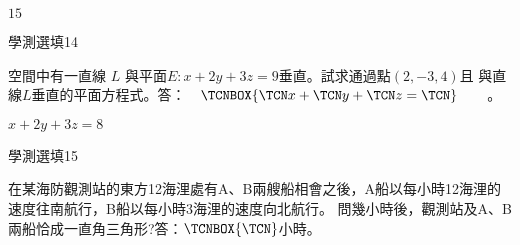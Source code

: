 \begin{QUESTIONS}
\begin{QUESTION}
\begin{QBODY}
        \end{QBODY}
        \begin{QFROMS}
        \end{QFROMS}
        \begin{QTAGS}\end{QTAGS}
        \begin{QANS}
			$15$
        \end{QANS}
        \begin{QSOLLIST}
        \end{QSOLLIST}
        \begin{QEMPTYSPACE}
        \end{QEMPTYSPACE}
    \end{QUESTION}
    \begin{QUESTION}
        \begin{ExamInfo}{89}{學測}{選填}{14}
        \end{ExamInfo}
        \begin{ExamAnsRateInfo}{}{}{}{}
        \end{ExamAnsRateInfo}
        \begin{QBODY}
		空間中有一直線 $L$ 與平面$E:x+2y+3z=9$垂直。試求通過點$(2,-3,4)$且
與直線$L$垂直的平面方程式。答：　$\TCNBOX{\TCN x+\TCN y+\TCN z=\TCN}$　　。
        \end{QBODY}
        \begin{QFROMS}
        \end{QFROMS}
        \begin{QTAGS}\end{QTAGS}
        \begin{QANS}
		$x+2y+3z=8$
        \end{QANS}
        \begin{QSOLLIST}
        \end{QSOLLIST}
        \begin{QEMPTYSPACE}
        \end{QEMPTYSPACE}
    \end{QUESTION}
    \begin{QUESTION}
        \begin{ExamInfo}{89}{學測}{選填}{15}
        \end{ExamInfo}
        \begin{ExamAnsRateInfo}{}{}{}{}
        \end{ExamAnsRateInfo}
        \begin{QBODY}
		在某海防觀測站的東方12海浬處有A、B兩艘船相會之後，A船以每小時12海浬的速度往南航行，B船以每小時3海浬的速度向北航行。
問幾小時後，觀測站及A、B兩船恰成一直角三角形?答：$\TCNBOX{\TCN}$小時。


\end{QBODY}
\end{QUESTION}
\end{QUESTIONS}
